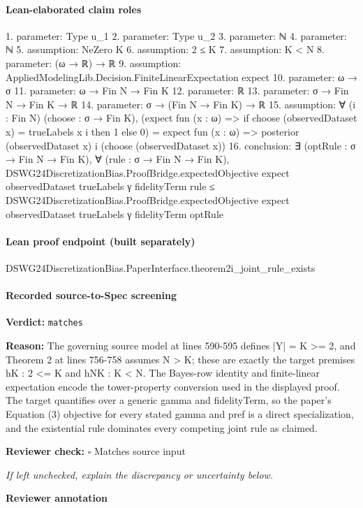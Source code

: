 \documentclass[10pt]{article}
\newcommand{\reviewerbox}{%
  \par\noindent\fbox{\parbox{0.96\linewidth}{\rule{0pt}{0.38in}}}\par
}
\newcommand{\reviewmatch}[1]{%
  \par\noindent\textbf{Reviewer check:} $\square$\; #1\par
  \noindent\emph{If left unchecked, explain the discrepancy or uncertainty below.}\par
}
\begin{document}
\paragraph{Lean-elaborated claim roles}\begin{ReviewVerbatim}
1. parameter: Type u_1
2. parameter: Type u_2
3. parameter: ℕ
4. parameter: ℕ
5. assumption: NeZero K
6. assumption: 2 ≤ K
7. assumption: K < N
8. parameter: (ω → ℝ) → ℝ
9. assumption: AppliedModelingLib.Decision.FiniteLinearExpectation expect
10. parameter: ω → σ
11. parameter: ω → Fin N → Fin K
12. parameter: ℝ
13. parameter: σ → Fin N → Fin K → ℝ
14. parameter: σ → (Fin N → Fin K) → ℝ
15. assumption: ∀ (i : Fin N) (choose : σ → Fin K),
  (expect fun (x : ω) => if choose (observedDataset x) = trueLabels x i then 1 else 0) =
    expect fun (x : ω) => posterior (observedDataset x) i (choose (observedDataset x))
16. conclusion: ∃ (optRule : σ → Fin N → Fin K),
  ∀ (rule : σ → Fin N → Fin K),
    DSWG24DiscretizationBias.ProofBridge.expectedObjective expect observedDataset trueLabels γ fidelityTerm rule ≤
      DSWG24DiscretizationBias.ProofBridge.expectedObjective expect observedDataset trueLabels γ fidelityTerm optRule
\end{ReviewVerbatim}

\paragraph{Lean proof endpoint (built separately)}\begin{ReviewVerbatim}
DSWG24DiscretizationBias.PaperInterface.theorem2i_joint_rule_exists
\end{ReviewVerbatim}

\paragraph{Recorded source-to-Spec screening}
\textbf{Verdict:} \texttt{matches}
\\
{\raggedright
\textbf{Reason:} The governing source model at lines 590-\allowbreak{}595 defines |Y| = K >= 2, and Theorem 2 at lines 756-\allowbreak{}758 assumes N > K;\allowbreak{} these are exactly the target premises hK :\allowbreak{} 2 <= K and hNK :\allowbreak{} K < N.\allowbreak{} The Bayes-\allowbreak{}row identity and finite-\allowbreak{}linear expectation encode the tower-\allowbreak{}property conversion used in the displayed proof.\allowbreak{} The target quantifies over a generic gamma and fidelityTerm, so the paper's Equation (3) objective for every stated gamma and pref is a direct specialization, and the existential rule dominates every competing joint rule as claimed.\allowbreak{}
\par}
\reviewmatch{Matches source input}
\noindent\textbf{Reviewer annotation}\par
\reviewerbox
\clearpage
\hypertarget{source-claim-cc8ba41c41752422}{}
\end{document}
